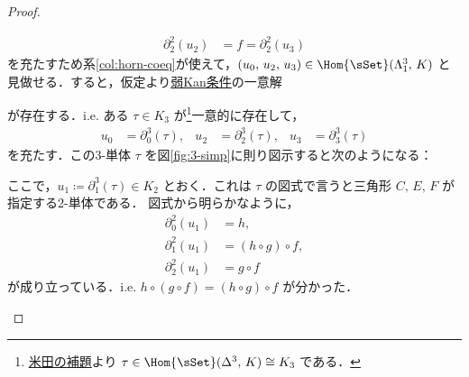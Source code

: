 \documentclass[TQFT_main]{subfiles}
\begin{document}
\begin{proof}
\begin{description}
\begin{description}
\begin{align}
                \partial^2_2 (u_2) &= f = \partial^2_2 (u_3)
            \end{align}
            を充たすため系\ref{col:horn-coeq}が使えて，$(u_0,\, u_2,\, u_3) \in \Hom{\sSet}(\Lambda^3_1,\, K)$ と見做せる．すると，仮定より\hyperref[def:KanCplx]{弱Kan条件}の一意解
            \begin{center}
            \end{center}
            が存在する．i.e. ある $\tau \in K_3$ が\footnote{\hyperref[lem:Yoneda]{米田の補題}より $\tau \in \Hom{\sSet}(\Delta^3,\, K) \cong K_3$ である．}一意的に存在して，
            \begin{align}
                u_0 &= \partial^3_0 (\tau), &
                u_2 &= \partial^3_2 (\tau), &
                u_3 &= \partial^3_3 (\tau)
            \end{align}
            を充たす．この3-単体 $\tau$ を図\ref{fig:3-simp}に則り図示すると次のようになる：
            \begin{center}
            \end{center}
            ここで，$u_1 \coloneqq \partial^3_1 (\tau) \in K_2$ とおく．これは $\tau$ の図式で言うと三角形 $C,\, E,\, F$ が指定する2-単体である．
            図式から明らかなように，
            \begin{align}
                \partial^2_0 (u_1) &= h, \\
                \partial^2_1 (u_1) &= (h\circ g) \circ f, \\
                \partial^2_2 (u_1) &= g \circ f
            \end{align}
            が成り立っている．i.e. $h \circ (g \circ f) = (h\circ g) \circ f$ が分かった．
        \end{description}
        

\end{description}
\end{proof}
\end{document}
